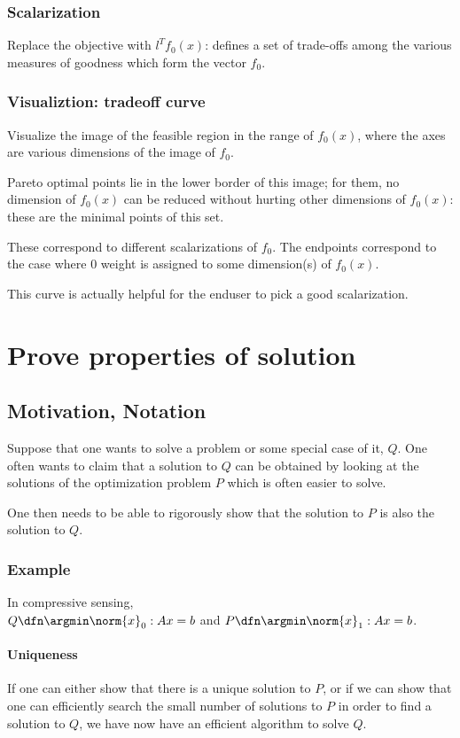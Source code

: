 \documentclass[oneside, article]{memoir}
\begin{document}
\subsection{Scalarization}
Replace the objective with $l^{T}f_0(x)$: defines a set of trade-offs among the various measures of goodness which form the vector $f_0$.

\subsection{Visualiztion: tradeoff curve}
Visualize the image of the feasible region in the range of $f_0(x)$, where the axes are various dimensions of the image of $f_0$.

Pareto optimal points lie in the lower border of this image; for them, no dimension of $f_0(x)$ can be reduced without hurting other dimensions of $f_0(x)$: these are the minimal points of this set.

These correspond to different scalarizations of $f_0$. The endpoints correspond to the case where 0 weight is assigned to some dimension(s) of $f_0(x)$.

This curve is actually helpful for the enduser to pick a good scalarization.

\chapter{Prove properties of solution}
\section{Motivation, Notation}
Suppose that one wants to solve a problem or some special case of it, $Q$. One often wants to claim that a solution to $Q$ can be obtained by looking at the solutions of the optimization problem $P$ which is often easier to solve.

One then needs to be able to rigorously show that the solution to $P$ is also the solution to $Q$.

\subsection{Example}
In compressive sensing, \\
$Q \dfn \argmin \norm{x}_0 : Ax = b$ and $P \dfn \argmin \norm{x}_1 : Ax = b$.

\subsubsection{Uniqueness}
If one can either show that there is a unique solution to $P$, or if we can show that one can efficiently search the small number of solutions to $P$ in order to find a solution to $Q$, we have now have an efficient algorithm to solve $Q$.
\end{document}
